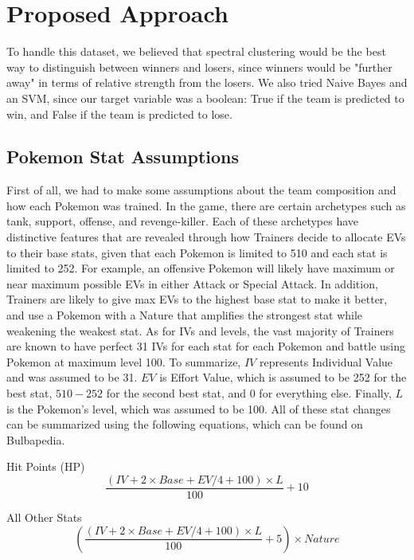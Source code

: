 \documentclass{acm_proc_article-sp}
\begin{document}
\section{Proposed Approach}
To handle this dataset, we believed that spectral clustering would be the best way to distinguish between winners and losers, since winners would be "further away" in terms of relative strength from the losers. We also tried Naive Bayes and an SVM, since our target variable was a boolean: True if the team is predicted to win, and False if the team is predicted to lose.

\subsection{Pokemon Stat Assumptions}
First of all, we had to make some assumptions about the team composition and how each Pokemon was trained. In the game, there are certain archetypes such as tank, support, offense, and revenge-killer. Each of these archetypes have distinctive features that are revealed through how Trainers decide to allocate EVs to their base stats, given that each Pokemon is limited to 510 and each stat is limited to 252. For example, an offensive Pokemon will likely have maximum or near maximum possible EVs in either Attack or Special Attack. In addition, Trainers are likely to give max EVs to the highest base stat to make it better, and use a Pokemon with a Nature that amplifies the strongest stat while weakening the weakest stat. As for IVs and levels, the vast majority of Trainers are known to have perfect 31 IVs for each stat for each Pokemon and battle using Pokemon at maximum level 100. To summarize, $IV$ represents Individual Value and was assumed to be 31. $EV$ is Effort Value, which is assumed to be 252 for the best stat, $510-252$ for the second best stat, and 0 for everything else. Finally, $L$ is the Pokemon's level, which was assumed to be 100. All of these stat changes can be summarized using the following equations, which can be found on Bulbapedia.

Hit Points (HP)
\begin{equation}\frac{(IV + 2 \times Base + EV/4 + 100) \times L}{100} + 10
\end{equation}

All Other Stats
\begin{equation}(\frac{(IV + 2 \times Base + EV/4 + 100) \times L}{100} + 5) \times Nature
\end{equation}
\end{document}

